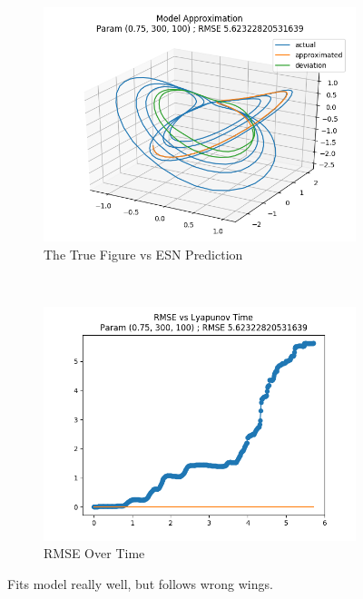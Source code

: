 \documentclass{article}
\begin{document}
\begin{figure}[H]
    \centering
    \begin{subfigure}[b]{0.45\textwidth}
        \includegraphics[width=\textwidth]{doc/paper/images/lorenz/rank_3_param_151_fit.png}
        \caption{The True Figure vs ESN Prediction}
        \label{fig:lorenz_r3_fit}
    \end{subfigure}
    ~
    \begin{subfigure}[b]{0.45\textwidth}
        \includegraphics[width=\textwidth]{doc/paper/images/lorenz/rank_3_param_151_rmse.png}
        \caption{RMSE Over Time}
        \label{fig:lorenz_r3_rmse}
    \end{subfigure}
    \caption{Fits model really well, but follows wrong wings.}
    \label{fig:lorenz_r3}
\end{figure}
\end{document}
